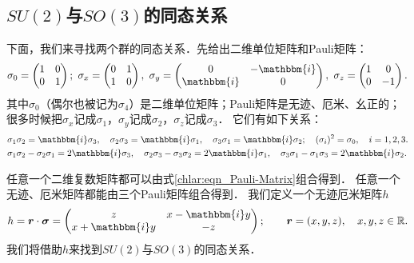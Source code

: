 \subsection{$SU(2)$与$SO(3)$的同态关系}\label{chlar:sec_SU2-SO3}
下面，我们来寻找两个群的同态关系．先给出二维单位矩阵和Pauli矩阵：
\begin{equation}\label{chlar:eqn_Pauli-Matrix}
    \sigma_0 = \begin{pmatrix} 1 & 0 \\ 0 & 1 \end{pmatrix}; \
    \sigma_x = \begin{pmatrix} 0 & 1 \\ 1 & 0 \end{pmatrix}, \
    \sigma_y = \begin{pmatrix} 0 & -\mathbbm{i} \\ \mathbbm{i} & 0 \end{pmatrix}, \
    \sigma_z = \begin{pmatrix} 1 & 0 \\ 0 & -1 \end{pmatrix}.
\end{equation}
其中$\sigma_0$（偶尔也被记为$\sigma_4$）是二维单位矩阵；Pauli矩阵是无迹、厄米、幺正的；
很多时候把$\sigma_x$记成$\sigma_1$，$\sigma_y$记成$\sigma_2$，$\sigma_z$记成$\sigma_3$．
它们有如下关系：
\begin{align}
    &\sigma_1 \sigma_2 = \mathbbm{i} \sigma_3,\quad
    \sigma_2 \sigma_3 = \mathbbm{i} \sigma_1,\quad
    \sigma_3 \sigma_1 = \mathbbm{i} \sigma_2;\quad
    (\sigma_i)^2 = \sigma_0, \quad i=1,2,3. \\
    &\sigma_1 \sigma_2-\sigma_2 \sigma_1=2\mathbbm{i} \sigma_3,\quad
    \sigma_2 \sigma_3-\sigma_3 \sigma_2=2\mathbbm{i} \sigma_1,\quad
    \sigma_3 \sigma_1-\sigma_1 \sigma_3=2\mathbbm{i} \sigma_2.
\end{align}%

任意一个二维复数矩阵都可以由式\eqref{chlar:eqn_Pauli-Matrix}组合得到．
任意一个无迹、厄米矩阵都能由三个Pauli矩阵组合得到．
我们定义一个无迹厄米矩阵$h$
\begin{equation}
    h = \boldsymbol{r}\cdot \boldsymbol{\sigma}
    =\begin{pmatrix}
        z & x- \mathbbm{i} y \\ x+ \mathbbm{i} y & -z
    \end{pmatrix}; 
    \qquad \boldsymbol{r}= (x,y,z), \quad x, y, z \in \mathbb{R} .
\end{equation}
我们将借助$h$来找到$SU(2)$与$SO(3)$的同态关系．

